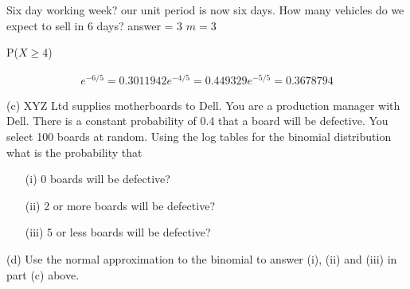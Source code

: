 \documentclass[]{report}
\begin{document}
Six day working week?
our unit period is now six days.
How many vehicles do we expect to sell in 6 days?
answer = 3
$m=3$

P($X\geq 4$)

\begin{eqnarray}
e^{-6/5} = 0.3011942
e^{-4/5} = 0.449329
e^{-5/5} = 0.3678794
\end{eqnarray}










(c)	XYZ Ltd supplies motherboards to Dell.  You are a production manager with Dell.  There is a constant probability of 0.4 that a board will be defective.  You select 100 boards at random.  Using the log tables for the binomial distribution what is the probability that

\begin{itemize}
	\item[(i)] 0 boards will be defective?
	\item[(ii)] 2 or more boards will be defective?
	\item[(iii)]	5 or less boards will be defective?
\end{itemize}
(d)	Use the normal approximation to the binomial to answer (i), (ii) and (iii) in part (c) above.
\end{document}
